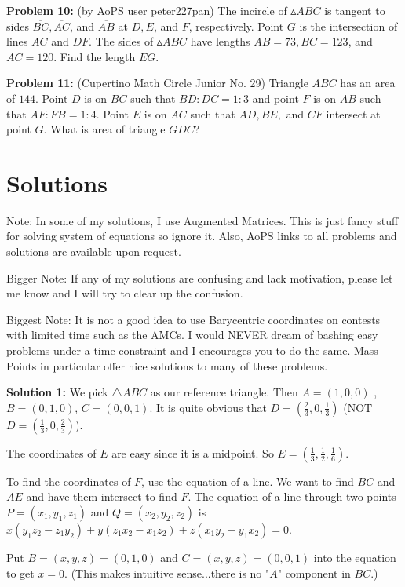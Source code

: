 \documentclass{article}
\begin{document}
\textbf{Problem 10:} (by AoPS user peter227pan)
The incircle of $\vartriangle ABC$ is tangent to sides $\overline{BC}, \overline{AC}$, and $\overline{AB}$ at $D, E$, and $F$, respectively. Point $G$ is the intersection of lines $AC$ and $DF$. The sides of $\vartriangle ABC$ have lengths $AB = 73, BC = 123$, and $AC = 120$. Find the length $EG$.

\vspace{.2in}


\textbf{Problem 11:} (Cupertino Math Circle Junior No. 29)
Triangle $ABC$ has an area of $144$. Point $D$ is on $BC$ such that $BD : DC =1 : 3$ and point $F$ is on $AB$ such that $AF : FB= 1 : 4$. Point $E$ is on $AC$ such that $AD, BE,$ and $CF$ intersect at point $G$. What is area of triangle $GDC$?

\section{Solutions}
Note: In some of my solutions, I use Augmented Matrices. This is just fancy stuff for solving system of equations so ignore it. Also, AoPS links to all problems and solutions are available upon request. 

Bigger Note: If any of my solutions are confusing and lack motivation, please let me know and I will try to clear up the confusion.

Biggest Note: It is not a good idea to use Barycentric coordinates on contests with limited time such as the AMCs. I would NEVER dream of bashing easy problems under a time constraint and I encourages you to do the same. Mass Points in particular offer nice solutions to many of these problems.
\vspace{.2in}


\textbf{Solution 1:}
We pick $\bigtriangleup ABC$ as our reference triangle. Then $A=(1,0,0)$ , $B=(0,1,0)$, $C=(0,0,1)$. It is quite obvious that $D=(\frac 23 ,0,\frac 13)$ (NOT $D=(\frac 13 ,0,\frac 23)$).

The coordinates of $E$ are easy since it is a midpoint. So $E=(\frac 13,\frac 12,\frac 16)$.

To find the coordinates of $F$, use the equation of a line. We want to find $BC$ and $AE$ and have them intersect to find $F$.  The equation of a line through two points $P=(x_1,y_1,z_1)$ and $Q=(x_2,y_2,z_2)$ is $x(y_1z_2 -z_1y_2)+y(z_1x_2-x_1z_2)+z(x_1y_2-y_1x_2)=0$. 

Put $B=(x,y,z) = (0,1,0)$ and $C=(x,y,z) = (0,0,1)$ into the equation to get $x = 0$. (This makes intuitive sense...there is no "$A$" component in $BC$.)
\end{document}

